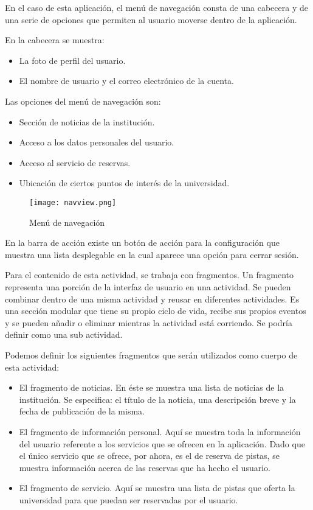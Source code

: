 En el caso de esta aplicación, el menú de navegación consta de una cabecera y de
una serie de opciones que permiten al usuario moverse dentro de la aplicación. 

En la cabecera se muestra: 

\begin{itemize}
\item La foto de perfil del usuario.
\item El nombre de usuario y el correo electrónico de la cuenta.
\end{itemize}

Las opciones del menú de navegación son: 

\begin{itemize}
\item Sección de noticias de la institución.
\item Acceso a los datos personales del usuario.
\item Acceso al servicio de reservas.
\item Ubicación de ciertos puntos de interés de la universidad.
\end{itemize}

\begin{figure}[h]
	\centering
	\texttt{[image: navview.png]}
	\caption{Menú de navegación}
	\label{fig:ejemplo}
\end{figure}

En la barra de acción existe un botón de acción para la configuración que muestra 
una lista desplegable en la cual aparece una opción para cerrar sesión.
\newline

Para el contenido de esta actividad, se trabaja con fragmentos. Un fragmento 
representa una porción de la interfaz de usuario en una actividad. Se pueden 
combinar dentro de una misma actividad y reusar en diferentes actividades. Es una 
sección modular que tiene su propio ciclo de vida, recibe sus propios eventos y 
se pueden añadir o eliminar mientras la actividad está corriendo. Se podría 
definir como una sub actividad. 
\newpage

Podemos definir los siguientes fragmentos que serán utilizados como cuerpo de 
esta actividad: 

\begin{itemize}
\item El fragmento de noticias. En éste se muestra una lista de noticias de la 
institución. Se especifica: el título de la noticia, una descripción breve y la 
fecha de publicación de la misma.
\item El fragmento de información personal. Aquí se muestra toda la información 
del usuario referente a los servicios que se ofrecen en la aplicación. Dado que 
el único servicio que se ofrece, por ahora, es el de reserva de pistas, se muestra
información acerca de las reservas que ha hecho el usuario.
\item El fragmento de servicio. Aquí se muestra una lista de pistas que oferta 
la universidad para que puedan ser reservadas por el usuario.
\end{itemize}

